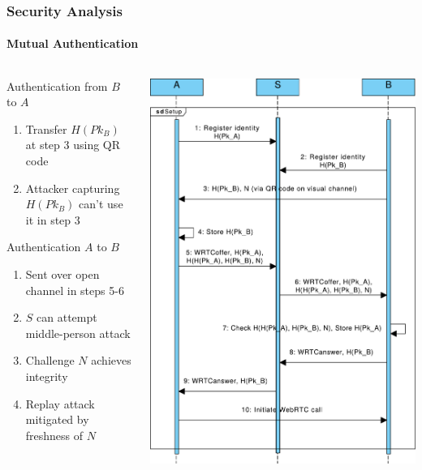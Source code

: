 \documentclass[handout, notes=show]{beamer}
\begin{document}
\begin{frame}
\frametitle{Security Analysis}
\framesubtitle{Mutual Authentication}

\begin{columns}[T]
\begin{column}[T]{0.6\textwidth}

Authentication from $B$ to $A$
\begin{enumerate}
\item Transfer $H(Pk_B)$ at step 3 using QR code
\item Attacker capturing $H(Pk_B)$ can't use it in step 3
\end{enumerate}

Authentication $A$ to $B$
\begin{enumerate}
\item Sent over open channel in steps 5-6
\item $S$ can attempt middle-person attack
\item Challenge $N$ achieves integrity
\item Replay attack mitigated by freshness of $N$
\end{enumerate}


\end{column}
\begin{column}[T]{0.4\textwidth}
\includegraphics[width=1.0\textwidth]{core-qr-thin}
\end{column}
\end{columns}

\end{frame}
\end{document}
